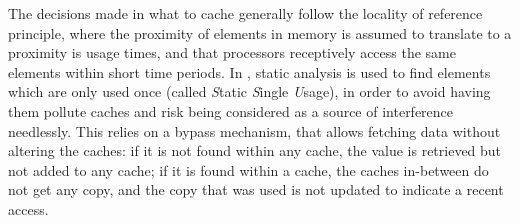The decisions made in what to cache generally follow the
locality of reference principle, where the proximity of elements in memory is
assumed to translate to a proximity is usage times, and that processors
receptively access the same elements within short time periods. In
\cite{10.1109/RTSS.2009.34}, static analysis is used to find elements which are
only used once (called \textit{S}tatic \textit{S}ingle \textit{U}sage), in
order to avoid having them pollute caches and risk being considered as a source
of interference needlessly. This relies on a bypass mechanism, that allows
fetching data without altering the caches: if it is not found within any cache,
the value is retrieved but not added to any cache; if it is found within a
cache, the caches in-between do not get any copy, and the copy that was used is
not updated to indicate a recent access.
\stopallthesefloats
